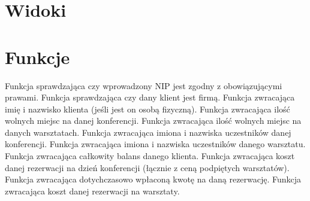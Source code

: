 \documentclass{article}
\begin{document}
\newpage 
\section{Widoki}
    
    
\newpage 
\section{Funkcje}
Funkcja sprawdzająca czy wprowadzony NIP jest zgodny z obowiązującymi prawami.
     \newline
Funkcja sprawdzająca czy dany klient jest firmą. 
     \newline
Funkcja zwracająca imię i nazwisko klienta (jeśli jest on osobą fizyczną).
     \newline
Funkcja zwracająca ilość wolnych miejsc na danej konferencji.
     \newline
Funkcja zwracająca ilość wolnych miejsc na danych warsztatach.
     \newline
Funkcja zwracająca imiona i nazwiska uczestników danej konferencji.
     \newline
Funkcja zwracająca imiona i nazwiska uczestników danego warsztatu.
     \newline
Funkcja zwracająca całkowity balans danego klienta.
     \newline
Funkcja zwracająca koszt danej rezerwacji na dzień konferencji (łącznie z ceną podpiętych warsztatów).
     \newline
Funkcja zwracająca dotychczasowo wpłaconą kwotę na daną rezerwację.
     \newline
Funkcja zwracająca koszt danej rezerwacji na warsztaty.
     \newline
\end{document}
